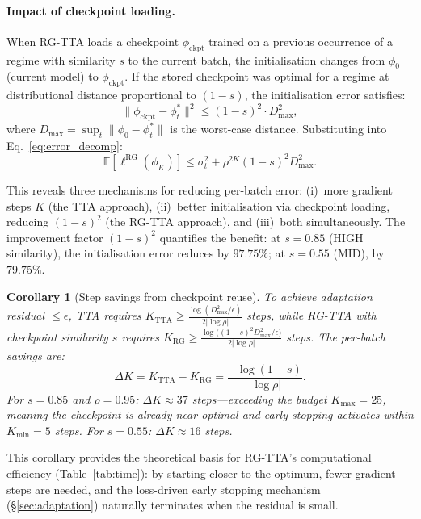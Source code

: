 \documentclass[11pt,a4paper]{article}
\newtheorem{corollary}{Corollary}
\begin{document}
\paragraph{Impact of checkpoint loading.} When RG-TTA loads a checkpoint $\phi_{\text{ckpt}}$ trained on a previous occurrence of a regime with similarity $s$ to the current batch, the initialisation changes from $\phi_0$ (current model) to $\phi_{\text{ckpt}}$. If the stored checkpoint was optimal for a regime at distributional distance proportional to $(1-s)$, the initialisation error satisfies:
\begin{equation}
    \|\phi_{\text{ckpt}} - \phi^*_t\|^2 \leq (1 - s)^2 \cdot D^2_{\max},
    \label{eq:init_reduction}
\end{equation}
where $D_{\max} = \sup_t \|\phi_0 - \phi^*_t\|$ is the worst-case distance. Substituting into Eq.~\ref{eq:error_decomp}:
\begin{equation}
    \mathbb{E}[\ell^{\text{RG}}(\phi_K)] \leq \sigma^2_t + \rho^{2K}(1-s)^2 D^2_{\max}.
    \label{eq:rg_error}
\end{equation}

This reveals three mechanisms for reducing per-batch error: (i)~more gradient steps $K$ (the TTA approach), (ii)~better initialisation via checkpoint loading, reducing $(1-s)^2$ (the RG-TTA approach), and (iii)~both simultaneously. The improvement factor $(1-s)^2$ quantifies the benefit: at $s = 0.85$ (HIGH similarity), the initialisation error reduces by $97.75\%$; at $s = 0.55$ (MID), by $79.75\%$.

\begin{corollary}[Step savings from checkpoint reuse]
\label{cor:steps}
To achieve adaptation residual $\leq \epsilon$, TTA requires
$K_{\text{TTA}} \geq \frac{\log(D^2_{\max}/\epsilon)}{2|\log\rho|}$
steps, while RG-TTA with checkpoint similarity $s$ requires
$K_{\text{RG}} \geq \frac{\log\big((1-s)^2 D^2_{\max}/\epsilon\big)}{2|\log\rho|}$
steps. The per-batch savings are:
\begin{equation}
    \Delta K = K_{\text{TTA}} - K_{\text{RG}} = \frac{-\log(1-s)}{|\log\rho|}.
    \label{eq:step_savings}
\end{equation}
For $s = 0.85$ and $\rho = 0.95$: $\Delta K \approx 37$ steps---exceeding the budget $K_{\max} = 25$, meaning the checkpoint is already near-optimal and early stopping activates within $K_{\min} = 5$ steps. For $s = 0.55$: $\Delta K \approx 16$ steps.
\end{corollary}

This corollary provides the theoretical basis for RG-TTA's computational efficiency (Table~\ref{tab:time}): by starting closer to the optimum, fewer gradient steps are needed, and the loss-driven early stopping mechanism (\S\ref{sec:adaptation}) naturally terminates when the residual is small.
\end{document}
